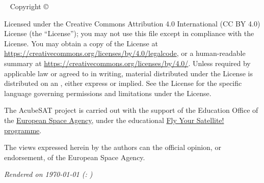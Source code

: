 \documentclass[a4paper,nobib]{tufte-book}
\begin{document}
\makeatother
\maketitle

\newpage
\begin{fullwidth}
~\vfill
\thispagestyle{empty}
\setlength{\parindent}{0pt}
\setlength{\parskip}{\baselineskip}
Copyright \copyright\ \the\year\ \thanklessauthor

\par{}

\par{}

\justify

\par Licensed under the Creative Commons Attribution 4.0 International (CC BY 4.0) License (the ``License''); you may not
use this file except in compliance with the License. You may obtain a copy
of the License at \url{https://creativecommons.org/licenses/by/4.0/legalcode}, or a human-readable summary at \url{https://creativecommons.org/licenses/by/4.0/}.
Unless
required by applicable law or agreed to in writing, material distributed
under the License is distributed on an , either express or implied. See the
License for the specific language governing permissions and limitations
under the License.

\par The AcubeSAT project is carried out with the support of the Education Office of the \href{https://www.esa.int/}{European Space Agency}, under the educational \href{https://www.esa.int/Education/CubeSats_-_Fly_Your_Satellite/}{Fly Your Satellite! programme}.

\par The views expressed herein by the authors can  the official opinion, or endorsement, of the European Space Agency.

\par\textit{Rendered on \today{} (\texttt{\gitcommit}: \gitcommitmessage)}
\end{fullwidth}

\tableofcontents

\begin{fullwidth}
\listoffigures

\listoftables

\bgroup
\setlength\parskip{1ex}
\printacronyms[pages={display=all,seq/use=false},]
\egroup

\end{fullwidth}
\end{document}
